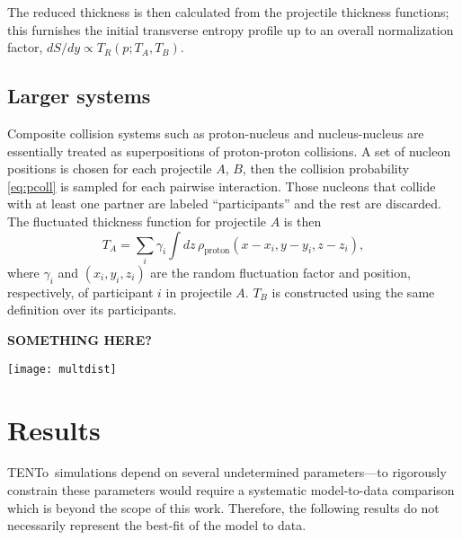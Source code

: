 \documentclass[aps,prl,reprint,amsmath,nofootinbib]{revtex4-1}
\newcommand{\trento}{T\raisebox{-.5ex}{R}ENTo}
\newcommand{\needcite}{\textbf{[???]}}
\begin{document}
The reduced thickness is then calculated from the projectile thickness functions; this furnishes the initial
transverse entropy profile up to an overall normalization factor, $dS/dy \propto T_R(p; T_A, T_B)$.

\subsection{Larger systems}

Composite collision systems such as proton-nucleus and nucleus-nucleus are essentially treated as
superpositions of proton-proton collisions.  A set of nucleon positions is chosen for each
projectile $A$, $B$, then the collision probability \eqref{eq:pcoll} is sampled for each pairwise interaction.
Those nucleons that collide with at least one partner are labeled ``participants'' and the rest are discarded.
The fluctuated thickness function for projectile $A$ is then
\begin{equation}
  T_A = \sum_i \gamma_i \int dz \, \rho_\text{proton}(x - x_i, y - y_i, z - z_i),
\end{equation}
where $\gamma_i$ and $(x_i, y_i, z_i)$ are the random fluctuation factor and position, respectively, of
participant $i$ in projectile $A$.  $T_B$ is constructed using the same definition over its participants.

\textbf{SOMETHING HERE?}


\begin{figure*}[t]
  \texttt{[image: multdist]}
  \caption{
    \label{fig:multdist}
    Multiplicity distributions for proton-proton, proton-lead, and lead-lead collisions.  The blue histograms
    are \protect\trento\ results from $10^6$ minimum-bias events for each collision system, all with reduced
    thickness parameter $p = 0$ (geometric mean) and gamma fluctuation parameter $k = 0.8$.  The normalization
    constants indicated in the legends are set so that the model and experimental distributions (points with
    error bars) have the same mean.  Experimental data are from ALICE \needcite.
  }
\end{figure*}


\section{Results}

\trento\ simulations depend on several undetermined parameters---to rigorously constrain these parameters
would require a systematic model-to-data comparison which is beyond the scope of this work.  Therefore, the
following results do not necessarily represent the best-fit of the model to data.
\end{document}
